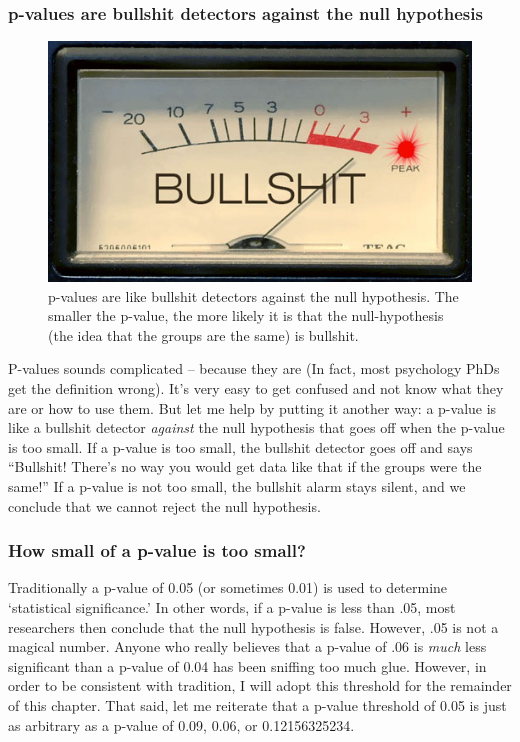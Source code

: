\documentclass[]{book}
\theoremstyle{definition}
\theoremstyle{definition}
\theoremstyle{remark}
\begin{document}
\subsubsection{p-values are bullshit detectors against the null
hypothesis}\label{p-values-are-bullshit-detectors-against-the-null-hypothesis}

\begin{figure}

{\centering \includegraphics[width=0.6\linewidth]{images/bsdetector} 

}

\caption{p-values are like bullshit detectors against the null hypothesis. The smaller the p-value, the more likely it is that the null-hypothesis (the idea that the groups are the same) is bullshit.}\label{fig:unnamed-chunk-338}
\end{figure}

P-values sounds complicated -- because they are (In fact, most
psychology PhDs get the definition wrong). It's very easy to get
confused and not know what they are or how to use them. But let me help
by putting it another way: a p-value is like a bullshit detector
\emph{against} the null hypothesis that goes off when the p-value is too
small. If a p-value is too small, the bullshit detector goes off and
says ``Bullshit! There's no way you would get data like that if the
groups were the same!'' If a p-value is not too small, the bullshit
alarm stays silent, and we conclude that we cannot reject the null
hypothesis.

\subsubsection{How small of a p-value is too
small?}\label{how-small-of-a-p-value-is-too-small}

Traditionally a p-value of 0.05 (or sometimes 0.01) is used to determine
`statistical significance.' In other words, if a p-value is less than
.05, most researchers then conclude that the null hypothesis is false.
However, .05 is not a magical number. Anyone who really believes that a
p-value of .06 is \emph{much} less significant than a p-value of 0.04
has been sniffing too much glue. However, in order to be consistent with
tradition, I will adopt this threshold for the remainder of this
chapter. That said, let me reiterate that a p-value threshold of 0.05 is
just as arbitrary as a p-value of 0.09, 0.06, or 0.12156325234.
\end{document}
